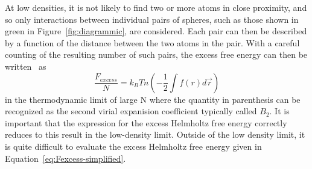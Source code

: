 \documentclass[double,12pt]{beavtex}
\begin{document}
At low densities, it is not likely to find two or more atoms in close 
proximity, and so only interactions between individual pairs of spheres, 
such as those shown in green in Figure~\ref{fig:diagrammic}, are considered.
Each pair can then be described by a function of the distance between the 
two atoms in the pair. 
With a careful counting of the resulting number of such pairs, the excess 
free energy can then be written~\cite{schroeder} as
\begin{equation}\label{eq:Fexcess}{\frac{F_{excess}}{N}=k_BTn\left(-\frac{1}{2}\int{f(r)}{d\vec{r}}\right)}\end{equation} 
in the thermodynamic limit of large N 
where the quantity in parenthesis can be recognized 
as the second virial expanision coefficient typically called $B_2$. 
It is important that the expression for the excess Helmholtz free energy 
correctly reduces to this result in the low-density limit. 
Outside of the low density limit, it is quite difficult to evaluate the 
excess Helmholtz free energy given in Equation~\ref{eq:Fexcess-simplified}. 

 
\end{document}
